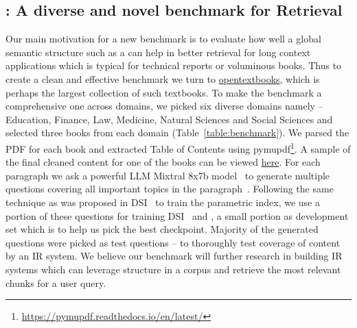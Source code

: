 \subsection{{\ben}: A diverse and novel benchmark for {\toc} Retrieval}

Our main motivation for a new benchmark is to evaluate how well a global semantic structure such as a {\toc} can help in better retrieval for long context applications which is typical for technical reports or voluminous books. Thus to create a clean and effective benchmark we turn to \href{https://open.umn.edu/opentextbooks/}{opentextbooks}, which is perhaps the largest collection of such textbooks. To make the benchmark a comprehensive one across domains, we picked six diverse domains namely -- Education, Finance, Law, Medicine, Natural Sciences and Social Sciences and selected three books from each domain (Table~\ref{table:benchmark}). We parsed the PDF for each book and extracted Table of Contents using pymupdf\footnote{\url{https://pymupdf.readthedocs.io/en/latest/}}. A sample of the final cleaned content for one of the books can be viewed \href{https://anonymous.4open.science/r/s_331/data/education/book1/v1/content.jsonl}{here}. For each paragraph we ask a powerful LLM Mixtral 8x7b model~\citep{jiang2024mixtral} to generate multiple questions covering all important topics in the paragraph~\cite{Zhang2024SyntheticKI}. Following the same technique as was proposed in DSI~\cite{Tay2022TransformerMA} to train the parametric index, we use a portion of these questions for training DSI~\cite{Tay2022TransformerMA} and {\sys}, a small portion as development set which is to help us pick the best checkpoint. Majority of the generated questions were picked as test questions -- to thoroughly test coverage of content by an IR system. We believe our benchmark {\ben} will further research in building IR systems which can leverage structure in a corpus and retrieve the most relevant chunks for a user query.




